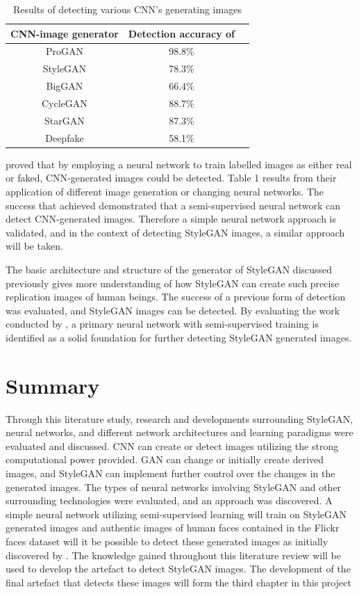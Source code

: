 \begin{table}[!htbp!]%
\caption{Results of \cite{Wang} detecting various CNN's generating images}
\label{tabl:1}
\centering
\small
\begin{tabular}{ccc}
\hline
CNN-image generator & Detection accuracy of \citep{Wang}\\ 
\hline
ProGAN & 98.8\% \\
StyleGAN & 78.3\% \\
BigGAN & 66.4\%\\
CycleGAN & 88.7\%\\
StarGAN & 87.3\%\\
Deepfake & 58.1\%\\
\hline
\end{tabular}
\end{table}

\cite{Wang} proved that by employing a neural network to train labelled images as either real or faked, CNN-generated images could be detected. Table 1 results from their application of different image generation or changing neural networks. The success that \cite{Wang} achieved demonstrated that a semi-supervised neural network can detect CNN-generated images. Therefore a simple neural network approach is validated, and in the context of detecting StyleGAN images, a similar approach will be taken.

The basic architecture and structure of the generator of StyleGAN discussed previously gives more understanding of how StyleGAN can create such precise replication images of human beings. The success of a previous form of detection was evaluated, and StyleGAN images can be detected. By evaluating the work conducted by \cite{Wang}, a primary neural network with semi-supervised training is identified as a solid foundation for further detecting StyleGAN generated images.

\section{Summary}

Through this literature study, research and developments surrounding StyleGAN, neural networks, and different network architectures and learning paradigms were evaluated and discussed. CNN can create or detect images utilizing the strong computational power provided. GAN can change or initially create derived images, and StyleGAN can implement further control over the changes in the generated images. The types of neural networks involving StyleGAN and other surrounding technologies were evaluated, and an approach was discovered. A simple neural network utilizing semi-supervised learning will train on StyleGAN generated images and authentic images of human faces contained in the Flickr faces dataset will it be possible to detect these generated images as initially discovered by \citep{Wang}. The knowledge gained throughout this literature review will be used to develop the artefact to detect StyleGAN images. The development of the final artefact that detects these images will form the third chapter in this project